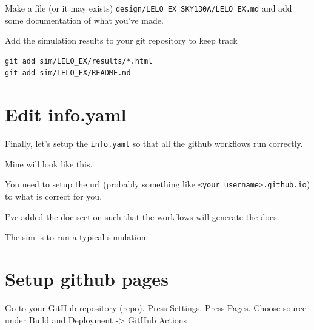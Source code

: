 Make a file (or it may exists)
\texttt{design/LELO\_EX\_SKY130A/LELO\_EX.md} and add some documentation
of what you've made.

Add the simulation results to your git repository to keep track

\begin{verbatim}
git add sim/LELO_EX/results/*.html
git add sim/LELO_EX/README.md 
\end{verbatim}

\section{Edit info.yaml}\label{edit-info.yaml}

Finally, let's setup the \texttt{info.yaml} so that all the github
workflows run correctly.

Mine will look like this.

You need to setup the url (probably something like
\texttt{\textless{}your\ username\textgreater{}.github.io}) to what is
correct for you.

I've added the doc section such that the workflows will generate the
docs.

The sim is to run a typical simulation.

\begin{Shaded}
\begin{Highlighting}[]
\KeywordTok{:}
\KeywordTok{:}
\KeywordTok{:}
\KeywordTok{:}
\KeywordTok{:}
\KeywordTok{:}
\KeywordTok{:}
\KeywordTok{:}
\AttributeTok{  }\KeywordTok{:}
\AttributeTok{    }\KeywordTok{:}
\AttributeTok{      }\KeywordTok{{-}}
\end{Highlighting}
\end{Shaded}

\section{Setup github pages}\label{setup-github-pages}

Go to your GitHub repository (repo). Press Settings. Press Pages. Choose
source under Build and Deployment -\textgreater{} GitHub Actions

